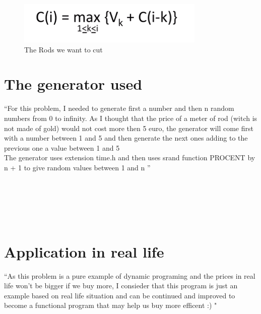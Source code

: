 \documentclass{article}
\begin{document}
\begin{figure}[h!]
\centering
\includegraphics[scale=0.6]{formula.PNG}
\caption{The Rods we want to cut}
\label{fig:universe}
\end{figure}




\section{The generator used}
``For this problem, I needed to generate first a number and then n random numbers from 0 to infinity. As I thought that the price of a meter of rod (witch is not made of gold) would not cost more then 5 euro, the generator will come first with a number between 1 and 5 and then generate the next ones adding to the previous one a value between 1 and 5\\ The generator uses extension time.h and then uses srand function PROCENT   by n + 1 to give random values between 1 and n '' \\\\\\\\\\\\





\section{Application in real life}
``As this problem is a pure example of dynamic programing and the prices in real life won't be bigger if we buy more, I consieder that this program is just an example based on real life situation and can be continued and improved to become a functional program that may help us buy more efficent :) " \\\\\\\\\\\\\  \
\end{document}
